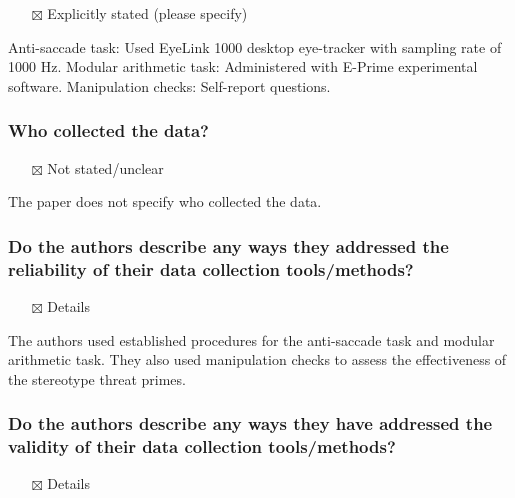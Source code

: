 \documentclass[
  doc, a4paper]{apa7}
\providecommand{\tightlist}{%
  \setlength{\itemsep}{0pt}\setlength{\parskip}{0pt}}
\begin{document}
\begin{itemize}
\tightlist
\item[$\boxtimes$]
  Explicitly stated (please specify)
\end{itemize}

Anti-saccade task: Used EyeLink 1000 desktop eye-tracker with sampling rate of 1000 Hz.
Modular arithmetic task: Administered with E-Prime experimental software.
Manipulation checks: Self-report questions.

\subsubsection{Who collected the data?}\label{who-collected-the-data}

\begin{itemize}
\tightlist
\item[$\boxtimes$]
  Not stated/unclear
\end{itemize}

The paper does not specify who collected the data.

\subsubsection{Do the authors describe any ways they addressed the reliability of their data collection tools/methods?}\label{do-the-authors-describe-any-ways-they-addressed-the-reliability-of-their-data-collection-toolsmethods}

\begin{itemize}
\tightlist
\item[$\boxtimes$]
  Details
\end{itemize}

The authors used established procedures for the anti-saccade task and modular arithmetic task. They also used manipulation checks to assess the effectiveness of the stereotype threat primes.

\subsubsection{Do the authors describe any ways they have addressed the validity of their data collection tools/methods?}\label{do-the-authors-describe-any-ways-they-have-addressed-the-validity-of-their-data-collection-toolsmethods}

\begin{itemize}
\tightlist
\item[$\boxtimes$]
  Details
\end{itemize}
\end{document}
